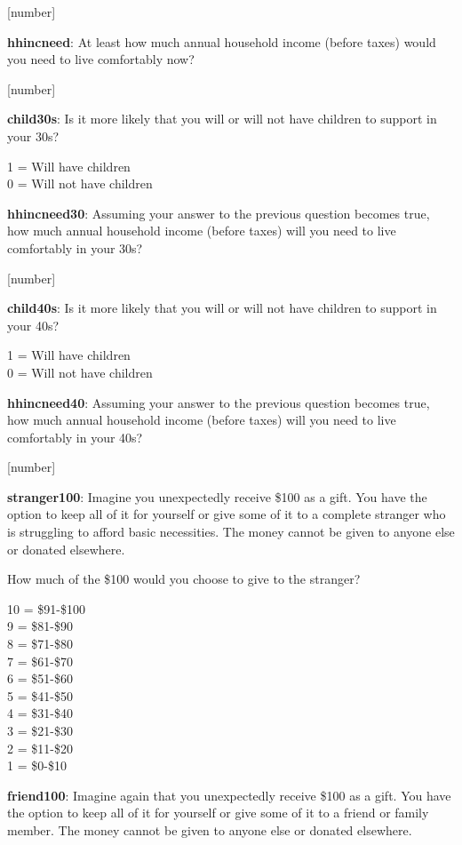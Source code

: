 \documentclass[11pt, headsepline]{article}
\begin{document}
[number]

\textbf{hhincneed}: At least how much annual household income (before taxes) would you need to live comfortably now?

[number]

\textbf{child30s}: Is it more likely that you will or will not have children to support in your 30s?

1 = Will have children \\
0 = Will not have children

\textbf{hhincneed30}: Assuming your answer to the previous question becomes true, how much annual household income (before taxes) will you need to live comfortably in your 30s?

[number]

\textbf{child40s}: Is it more likely that you will or will not have children to support in your 40s?

1 = Will have children \\
0 = Will not have children

\textbf{hhincneed40}: Assuming your answer to the previous question becomes true, how much annual household income (before taxes) will you need to live comfortably in your 40s?

[number]

\textbf{stranger100}: Imagine you unexpectedly receive \$100 as a gift. You have the option to keep all of it for yourself or give some of it to a complete stranger who is struggling to afford basic necessities. The money cannot be given to anyone else or donated elsewhere.

How much of the \$100 would you choose to give to the stranger?

10 = \$91-\$100 \\
9 = \$81-\$90 \\
8 = \$71-\$80 \\
7 = \$61-\$70 \\
6 = \$51-\$60 \\
5 = \$41-\$50 \\
4 = \$31-\$40 \\
3 = \$21-\$30 \\
2 = \$11-\$20 \\
1 = \$0-\$10 

\textbf{friend100}: Imagine again that you unexpectedly receive \$100 as a gift. You have the option to keep all of it for yourself or give some of it to a friend or family member. The money cannot be given to anyone else or donated elsewhere.
\end{document}
